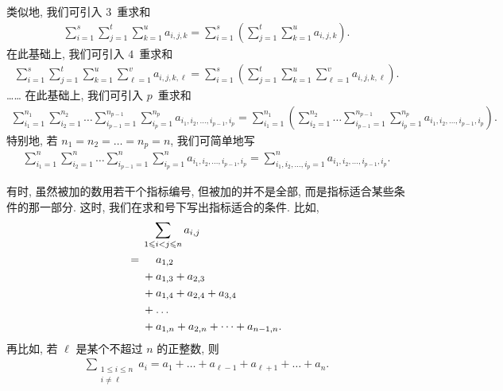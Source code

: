 \documentclass[../libro.tex]{subfiles}
\begin{document}
类似地, 我们可引入 \(3\)~重求和
\begin{align*}
    \sum_{i = 1}^{s} {
        \sum_{j = 1}^{t} {
            \sum_{k = 1}^{u} {
    a_{i,j,k}}}}
    =
    \sum_{i = 1}^{s}
    {\left( \sum_{j = 1}^{t} {
                \sum_{k = 1}^{u} {
    a_{i,j,k} }} \right)}.
\end{align*}
在此基础上, 我们可引入 \(4\)~重求和
\begin{align*}
    \sum_{i = 1}^{s} {
        \sum_{j = 1}^{t} {
            \sum_{k = 1}^{u} {
                \sum_{\ell = 1}^{v} {
    a_{i,j,k,\ell} }}}}
    =
    \sum_{i = 1}^{s}
    {\left(
            \sum_{j = 1}^{t} {
                \sum_{k = 1}^{u} {
                    \sum_{\ell = 1}^{v} {
            a_{i,j,k,\ell} }}}
    \right)}.
\end{align*}
……
在此基础上, 我们可引入 \(p\)~重求和
\begin{align*}
    \sum_{i_1 = 1}^{n_1} {
        \sum_{i_2 = 1}^{n_2} {
            \dots
            \sum_{i_{p-1} = 1}^{n_{p-1}} {
                \sum_{i_p = 1}^{n_p} {
    a_{i_1,i_2,\dots,i_{p-1},i_p} }}}}
    = \sum_{i_1 = 1}^{n_1}
    {\left(
            \sum_{i_2 = 1}^{n_2} {
                \dots
                \sum_{i_{p-1} = 1}^{n_{p-1}} {
                    \sum_{i_p = 1}^{n_p} {
            a_{i_1,i_2,\dots,i_{p-1},i_p}}}}
    \right)}.
\end{align*}
特别地, 若 \(n_1 = n_2 = \dots = n_p = n\),
我们可简单地写
\begin{align*}
    \sum_{i_1 = 1}^{n} {
        \sum_{i_2 = 1}^{n} {
            \dots
            \sum_{i_{p-1} = 1}^{n} {
                \sum_{i_p = 1}^{n} {
    a_{i_1,i_2,\dots,i_{p-1},i_p} }}}}
    =
    \sum_{i_1,i_2,\dots,i_p = 1}^{n}
    {a_{i_1,i_2,\dots,i_{p-1},i_p}}.
\end{align*}

有时, 虽然被加的数用若干个指标编号,
但被加的并不是全部,
而是指标适合某些条件的那一部分.
这时, 我们在求和号下写出指标适合的条件.
比如,
\begin{align*}
    & \sum_{1 \leq i < j \leq n} {a_{i,j}}
    \\
    = {} & \hphantom{{} + {}} a_{1,2}
    \\
    & + a_{1,3} + a_{2,3}
    \\
    & + a_{1,4} + a_{2,4} + a_{3,4}
    \\
    & +
    \dots
    \\
    & + a_{1,n} + a_{2,n} + \dots + a_{n-1,n}.
\end{align*}
再比如, 若 \(\ell\) 是某个不超过 \(n\) 的正整数, 则
\begin{align*}
    \sum_{\substack{1 \leq i \leq n \\ i \neq \ell}}
    {a_i}
    = a_1 + \dots + a_{\ell-1} + a_{\ell+1} + \dots + a_n.
\end{align*}
\end{document}

